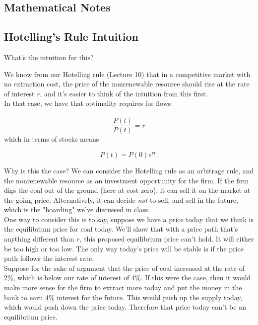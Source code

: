\begin{appendices}


\section{Mathematical Notes}

\begin{subappendices}
\subsection{Hotelling's Rule Intuition}\label{sec:hotellingrule}
What's the intuition for this? 
    
    We know from our Hotelling rule (Lecture 10) that in a competitive market with no extraction cost, the price of the nonrenewable resource should rise at the rate of interest $r$, and it's easier to think of the intuition from this first.\\

    
    In that case, we have that optimality requires for flows
    
        \begin{equation*}
            \frac{\dot{P(t)}}{P(t)} = r
        \end{equation*}
    which in terms of stocks means
    
        \begin{equation*}
            P(t)=P(0)e^{rt}.
        \end{equation*}
    
    Why is this the case? We can consider the Hotelling rule as an arbitrage rule, and the nonrenewable resource as an investment opportunity for the firm. If the firm digs the coal out of the ground (here at cost zero), it can sell it on the market at the going price. Alternatively, it can decide \textit{not} to sell, and sell in the future, which is the "hoarding" we've discussed in class.\\
    
    One way to consider this is to say, suppose we have a price today that we think is the equilibrium price for coal today. We'll show that with a price path that's anything different than $r$, this proposed equilibrium price can't hold. It will either be too high or too low. The only way today's price will be stable is if the price path follows the interest rate.\\
    
    Suppose for the sake of argument that the price of coal increased at the rate of 2\%, which is below our rate of interest of 4\%. If this were the case, then it would make more sense for the firm to extract more today and put the money in the bank to earn 4\% interest for the future. This would push up the supply today, which would push down the price today. Therefore that price today can't be an equilibrium price.\\
    

\end{subappendices}
\end{appendices}
